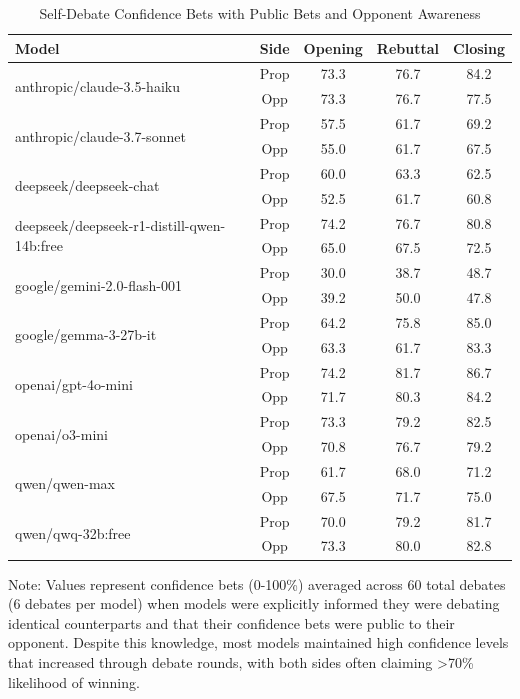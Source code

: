 \documentclass{article}
\begin{document}
\begin{table}[htbp]
  \centering
  \caption{Self-Debate Confidence Bets with Public Bets and Opponent Awareness}
  \label{tab:self-debate-public}
  \begin{tabular}{l|c|ccc}
      \toprule
      \textbf{Model} & \textbf{Side} & \textbf{Opening} & \textbf{Rebuttal} & \textbf{Closing} \\
      \midrule
      \multirow{2}{*}{anthropic/claude-3.5-haiku} & Prop & 73.3 & 76.7 & 84.2 \\
       & Opp & 73.3 & 76.7 & 77.5 \\
      \midrule
      \multirow{2}{*}{anthropic/claude-3.7-sonnet} & Prop & 57.5 & 61.7 & 69.2 \\
       & Opp & 55.0 & 61.7 & 67.5 \\
      \midrule
      \multirow{2}{*}{deepseek/deepseek-chat} & Prop & 60.0 & 63.3 & 62.5 \\
       & Opp & 52.5 & 61.7 & 60.8 \\
      \midrule
      \multirow{2}{*}{deepseek/deepseek-r1-distill-qwen-14b:free} & Prop & 74.2 & 76.7 & 80.8 \\
       & Opp & 65.0 & 67.5 & 72.5 \\
      \midrule
      \multirow{2}{*}{google/gemini-2.0-flash-001} & Prop & 30.0 & 38.7 & 48.7 \\
       & Opp & 39.2 & 50.0 & 47.8 \\
      \midrule
      \multirow{2}{*}{google/gemma-3-27b-it} & Prop & 64.2 & 75.8 & 85.0 \\
       & Opp & 63.3 & 61.7 & 83.3 \\
      \midrule
      \multirow{2}{*}{openai/gpt-4o-mini} & Prop & 74.2 & 81.7 & 86.7 \\
       & Opp & 71.7 & 80.3 & 84.2 \\
      \midrule
      \multirow{2}{*}{openai/o3-mini} & Prop & 73.3 & 79.2 & 82.5 \\
       & Opp & 70.8 & 76.7 & 79.2 \\
      \midrule
      \multirow{2}{*}{qwen/qwen-max} & Prop & 61.7 & 68.0 & 71.2 \\
       & Opp & 67.5 & 71.7 & 75.0 \\
      \midrule
      \multirow{2}{*}{qwen/qwq-32b:free} & Prop & 70.0 & 79.2 & 81.7 \\
       & Opp & 73.3 & 80.0 & 82.8 \\
      \bottomrule
  \end{tabular}
  \begin{tablenotes}
    \small
    \item Note: Values represent confidence bets (0-100\%) averaged across 60 total debates (6 debates per model) when models were explicitly informed they were debating identical counterparts and that their confidence bets were public to their opponent. Despite this knowledge, most models maintained high confidence levels that increased through debate rounds, with both sides often claiming >70\% likelihood of winning.
  \end{tablenotes}
\end{table}
\end{document}
